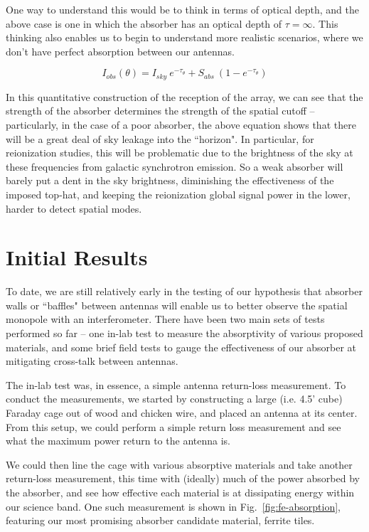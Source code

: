 One way to understand this would be to think in terms of optical depth, and the 
above case is one in which the absorber has an optical depth of $\tau = 
\infty$. This thinking also enables us to begin to understand more realistic 
scenarios, where we don't have perfect absorption between our antennas.

\begin{equation}
    I_{obs}(\theta) = I_{sky}~e^{-\tau_\theta} + S_{abs}~(1 - e^{-\tau_\theta})
    \label{eq:abs-optical-depth}
\end{equation}

In this quantitative construction of the reception of the array, we can see 
that the strength of the absorber determines the strength of the spatial cutoff 
-- particularly, in the case of a poor absorber, the above equation shows that 
there will be a great deal of sky leakage into the ``horizon". In particular, 
for reionization studies, this will be problematic due to the brightness of the 
sky at these frequencies from galactic synchrotron emission. So a weak absorber 
will barely put a dent in the sky brightness, diminishing the effectiveness of 
the imposed top-hat, and keeping the reionization global signal power in the 
lower, harder to detect spatial modes.

\section{Initial Results}

To date, we are still relatively early in the testing of our hypothesis that 
absorber walls or ``baffles" between antennas will enable us to better observe 
the spatial monopole with an interferometer. There have been two main sets of 
tests performed so far -- one in-lab test to measure the absorptivity of 
various proposed materials, and some brief field tests to gauge the 
effectiveness of our absorber at mitigating cross-talk between antennas.

The in-lab test was, in essence, a simple antenna return-loss measurement. To 
conduct the measurements, we started by constructing a large (i.e. 4.5' cube) 
Faraday cage out of wood and chicken wire, and placed an antenna at its center.  
From this setup, we could perform a simple return loss measurement and see what 
the maximum power return to the antenna is.

We could then line the cage with various absorptive materials and take another 
return-loss measurement, this time with (ideally) much of the power absorbed by 
the absorber, and see how effective each material is at dissipating energy 
within our science band. One such measurement is shown in 
Fig.~\ref{fig:fe-absorption}, featuring our most promising absorber candidate 
material, ferrite tiles.

